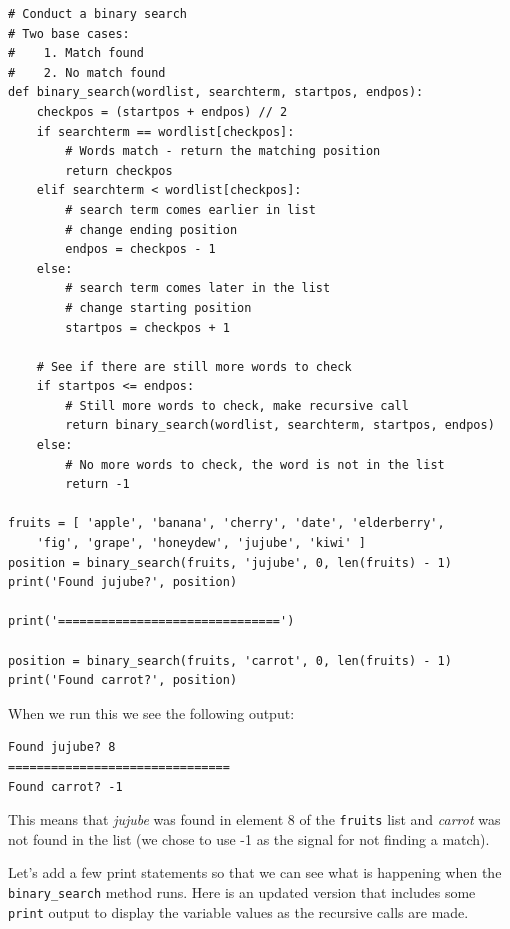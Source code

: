 \beforeverb
\begin{verbatim}
# Conduct a binary search
# Two base cases:
#    1. Match found
#    2. No match found
def binary_search(wordlist, searchterm, startpos, endpos):
    checkpos = (startpos + endpos) // 2
    if searchterm == wordlist[checkpos]:
        # Words match - return the matching position
        return checkpos
    elif searchterm < wordlist[checkpos]:
        # search term comes earlier in list
        # change ending position
        endpos = checkpos - 1
    else:
        # search term comes later in the list
        # change starting position
        startpos = checkpos + 1

    # See if there are still more words to check
    if startpos <= endpos:
        # Still more words to check, make recursive call
        return binary_search(wordlist, searchterm, startpos, endpos)
    else:
        # No more words to check, the word is not in the list
        return -1

fruits = [ 'apple', 'banana', 'cherry', 'date', 'elderberry',
    'fig', 'grape', 'honeydew', 'jujube', 'kiwi' ]
position = binary_search(fruits, 'jujube', 0, len(fruits) - 1)
print('Found jujube?', position)
    
print('===============================')

position = binary_search(fruits, 'carrot', 0, len(fruits) - 1)
print('Found carrot?', position)
\end{verbatim}
\afterverb

When we run this we see the following output:

\beforeverb
\begin{verbatim}
Found jujube? 8
===============================
Found carrot? -1
\end{verbatim}
\afterverb

This means that \textit{jujube} was found in element 8 of the \texttt{fruits} list and \textit{carrot} was not found in the list (we chose to use -1 as the signal for not finding a match).

Let's add a few print statements so that we can see what is happening when the \texttt{binary\_search} method runs. Here is an updated version that includes some \texttt{print} output to display the variable values as the recursive calls are made. 


